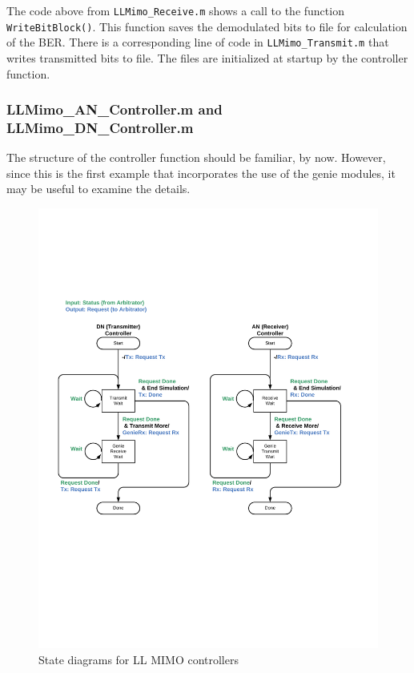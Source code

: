 The code above from \verb+LLMimo_Receive.m+ shows a call to the
function \verb+WriteBitBlock()+.  This function saves the
demodulated bits to file for calculation of the BER.  There is a
corresponding line of code in \verb+LLMimo_Transmit.m+ that writes
transmitted bits to file.  The files are initialized at startup by
the controller function.

\subsubsection{LLMimo\_AN\_Controller.m and LLMimo\_DN\_Controller.m}

The structure of the controller function should be familiar, by now.
However, since this is the first example that incorporates the use
of the genie modules, it may be useful to examine the details.

\begin{figure}[h]
\centering
\includegraphics[width=5in]{figs/LL_MIMO_State_Diagram}
\caption{State diagrams for LL MIMO controllers}
\label{fig:llmimoState}
\end{figure}

